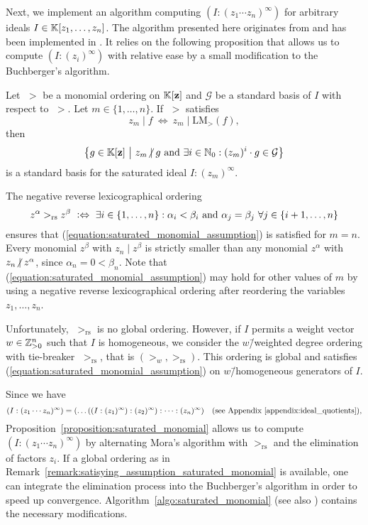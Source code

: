 Next, we implement an algorithm computing $(I : (z_1\cdots z_n)^\infty)$ for arbitrary ideals $I\in\mathbb{K}[z_1,\dots,z_n]$. The algorithm presented here originates from \cite{gitfan_symmetry} and has been implemented in \gitfanlib. It relies on the following proposition that allows us to compute $(I : (z_i)^\infty)$ with relative ease by a small modification to the Buchberger's algorithm.

\begin{prop}
	\label{proposition:saturated_monomial}
	Let $\;>$ be a monomial ordering on $\mathbb{K}[\mathbf{z}]$ and $\mathcal{G}$ be a standard basis of $I$ with respect to $\;>$. Let $m\in\{1,\dots,n\}$. If $\;>$ satisfies
	\begin{equation}
		\label{equation:saturated_monomial_assumption}
		z_m \mid f\ \Leftrightarrow\ z_m \mid \text{LM}_>(f),
	\end{equation}
	then
	$$\left\{g\in\field[\mathbf{z}]\ \middle|\ z_m \centernot\mid g\ \mathrm{and}\ \exists i\in\natural_0: (z_m)^i \cdot g \in \mathcal{G}\right\}$$
	is a standard basis for the saturated ideal $I : (z_m)^\infty$. 
\end{prop}

\begin{remark}
	\label{remark:satisying_assumption_saturated_monomial}
	The negative reverse lexicographical ordering
	$$z^\alpha >_\text{rs} z^\beta\ \defequiv\ \exists i\in\{1,\dots,n\}: \alpha_i < \beta_i\ \text{and}\ \alpha_j = \beta_j\ \forall j\in\{i+1,\dots,n\}$$
	ensures that (\ref{equation:saturated_monomial_assumption}) is satisfied for $m=n$. Every monomial $z^\beta$ with $z_n \mid z^\beta$ is strictly smaller than any monomial $z^\alpha$ with $z_n \centernot\mid z^\alpha$, since $\alpha_n = 0 < \beta_n$. Note that (\ref{equation:saturated_monomial_assumption}) may hold for other values of $m$ by using a negative reverse lexicographical ordering after reordering the variables $z_1,\dots,z_n$.
	
	Unfortunately, $\;>_\text{rs}$ is no global ordering. However, if $I$ permits a weight vector $w\in\mathbb{Z}^n_{>0}$ such that $I$ is homogeneous, we consider the $w$\=/weighted degree ordering with tie-breaker $\;>_\text{rs}$, that is $(>_w, >_\text{rs})$. This ordering is global and satisfies (\ref{equation:saturated_monomial_assumption}) on $w$\=/homogeneous generators of $I$.
\end{remark}

Since we have
$$(I:(z_1\cdots z_n)^\infty) = (\dots((I:(z_1)^\infty):(z_2)^\infty):\dots : (z_n)^\infty)\quad\text{(see Appendix \ref{appendix:ideal_quotients})},$$
Proposition~\ref{proposition:saturated_monomial} allows us to compute $(I : (z_1\cdots z_n)^\infty)$ by alternating Mora's algorithm with $>_\text{rs}$ and the elimination of factors $z_i$. If a global ordering as in Remark~\ref{remark:satisying_assumption_saturated_monomial} is available, one can integrate the elimination process into the Buchberger's algorithm in order to speed up convergence. Algorithm~\ref{algo:saturated_monomial} (see also \cite[Algorithm 3.3]{gitfan_symmetry}) contains the necessary modifications.

